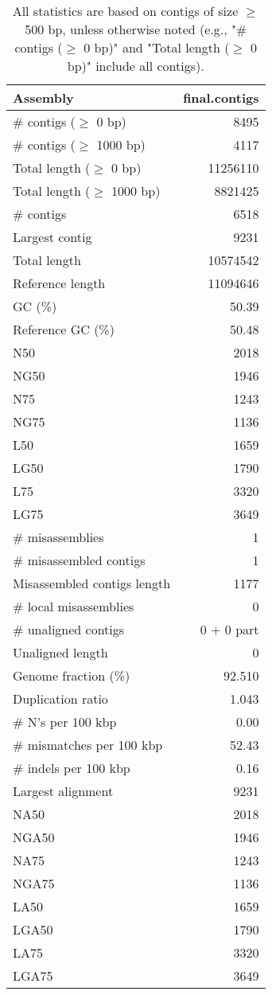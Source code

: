 \documentclass[12pt,a4paper]{article}
\begin{document}
\begin{table}[ht]
\begin{center}
\caption{All statistics are based on contigs of size $\geq$ 500 bp, unless otherwise noted (e.g., "\# contigs ($\geq$ 0 bp)" and "Total length ($\geq$ 0 bp)" include all contigs).}
\begin{tabular}{|l*{1}{|r}|}
\hline
Assembly & final.contigs \\ \hline
\# contigs ($\geq$ 0 bp) & 8495 \\ \hline
\# contigs ($\geq$ 1000 bp) & 4117 \\ \hline
Total length ($\geq$ 0 bp) & 11256110 \\ \hline
Total length ($\geq$ 1000 bp) & 8821425 \\ \hline
\# contigs & 6518 \\ \hline
Largest contig & 9231 \\ \hline
Total length & 10574542 \\ \hline
Reference length & 11094646 \\ \hline
GC (\%) & 50.39 \\ \hline
Reference GC (\%) & 50.48 \\ \hline
N50 & 2018 \\ \hline
NG50 & 1946 \\ \hline
N75 & 1243 \\ \hline
NG75 & 1136 \\ \hline
L50 & 1659 \\ \hline
LG50 & 1790 \\ \hline
L75 & 3320 \\ \hline
LG75 & 3649 \\ \hline
\# misassemblies & 1 \\ \hline
\# misassembled contigs & 1 \\ \hline
Misassembled contigs length & 1177 \\ \hline
\# local misassemblies & 0 \\ \hline
\# unaligned contigs & 0 + 0 part \\ \hline
Unaligned length & 0 \\ \hline
Genome fraction (\%) & 92.510 \\ \hline
Duplication ratio & 1.043 \\ \hline
\# N's per 100 kbp & 0.00 \\ \hline
\# mismatches per 100 kbp & 52.43 \\ \hline
\# indels per 100 kbp & 0.16 \\ \hline
Largest alignment & 9231 \\ \hline
NA50 & 2018 \\ \hline
NGA50 & 1946 \\ \hline
NA75 & 1243 \\ \hline
NGA75 & 1136 \\ \hline
LA50 & 1659 \\ \hline
LGA50 & 1790 \\ \hline
LA75 & 3320 \\ \hline
LGA75 & 3649 \\ \hline
\end{tabular}
\end{center}
\end{table}
\end{document}
